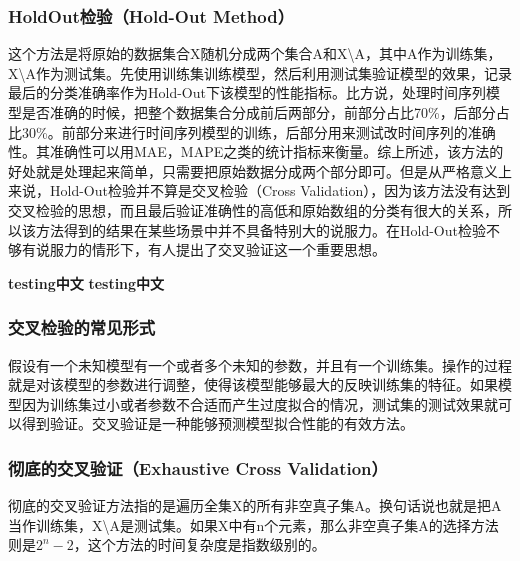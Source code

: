 \documentclass[10pt,a4paper]{ctexbook}
\begin{document}
\subsubsection{HoldOut检验（Hold-Out Method）}
这个方法是将原始的数据集合X随机分成两个集合A和X\textbackslash{A}，其中A作为训练集，X\textbackslash{A}作为测试集。先使用训练集训练模型，然后利用测试集验证模型的效果，记录最后的分类准确率作为Hold-Out下该模型的性能指标。比方说，处理时间序列模型是否准确的时候，把整个数据集合分成前后两部分，前部分占比70\%，后部分占比30\%。前部分来进行时间序列模型的训练，后部分用来测试改时间序列的准确性。其准确性可以用MAE，MAPE之类的统计指标来衡量。综上所述，该方法的好处就是处理起来简单，只需要把原始数据分成两个部分即可。但是从严格意义上来说，Hold-Out检验并不算是交叉检验（Cross Validation），因为该方法没有达到交叉检验的思想，而且最后验证准确性的高低和原始数组的分类有很大的关系，所以该方法得到的结果在某些场景中并不具备特别大的说服力。在Hold-Out检验不够有说服力的情形下，有人提出了交叉验证这一个重要思想。

\textbf{testing中文}
\bf{testing中文}

\subsubsection{交叉检验的常见形式}
假设有一个未知模型有一个或者多个未知的参数，并且有一个训练集。操作的过程就是对该模型的参数进行调整，使得该模型能够最大的反映训练集的特征。如果模型因为训练集过小或者参数不合适而产生过度拟合的情况，测试集的测试效果就可以得到验证。交叉验证是一种能够预测模型拟合性能的有效方法。

\subsubsection{彻底的交叉验证（Exhaustive Cross Validation）}
彻底的交叉验证方法指的是遍历全集X的所有非空真子集A。换句话说也就是把A当作训练集，X\textbackslash{A}是测试集。如果X中有n个元素，那么非空真子集A的选择方法则是$2^{n}-2$，这个方法的时间复杂度是指数级别的。
\end{document}
